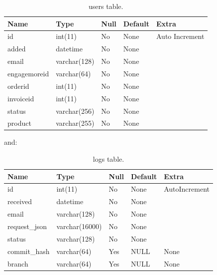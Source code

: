 \documentclass[final,letterpaper,12pt]{article}
\begin{document}
\begin{table}[ht]
\begin{tabular}{|l|l|l|l|l|}
\hline
Name&Type&Null&Default&Extra\\ \hline
id&int(11)&No&None&Auto Increment\\
added&datetime&No&None&\\
email&varchar(128)&No&None&\\
engagemoreid&varchar(64)&No&None&\\
orderid&int(11)&No&None&\\
invoiceid&int(11)&No&None&\\
status&varchar(256)&No&None&\\
product&varchar(255)&No&None&\\
\hline
\end{tabular}
\caption{\label{tab:users}users table.}
\end{table}

\newpage
\noindent and:
\begin{table}[ht]
\begin{tabular}{|l|l|l|l|l|}
\hline
Name&Type&Null&Default&Extra\\ \hline
id&int(11)&No&None&AutoIncrement\\
received&datetime&No&None&\\
email&varchar(128)&No&None&\\
request\_json&varchar(16000)&No&None&\\
status&varchar(128)&No&None&\\
commit\_hash&varchar(64)&Yes&NULL&None\\
branch&varchar(64)&Yes&NULL&None\\
\hline
\end{tabular}

\caption{\label{tab:logs}logs table.}
\end{table}

\newpage
\end{document}
